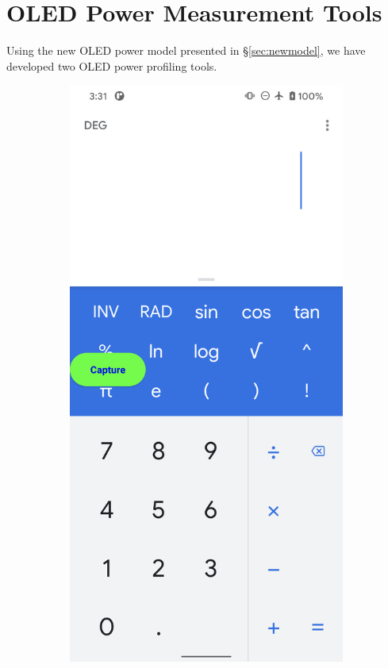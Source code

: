\section{OLED Power Measurement Tools}
\label{sec:tools}

Using the new OLED power model presented in \S\ref{sec:newmodel}, we
have developed two OLED power profiling tools.

\begin{figure}[tp]
	\begin{subfigure}[]{0.30\columnwidth}
		\includegraphics[width=\textwidth]{figure/001_app_capture.png}

\end{subfigure}
\end{figure}
